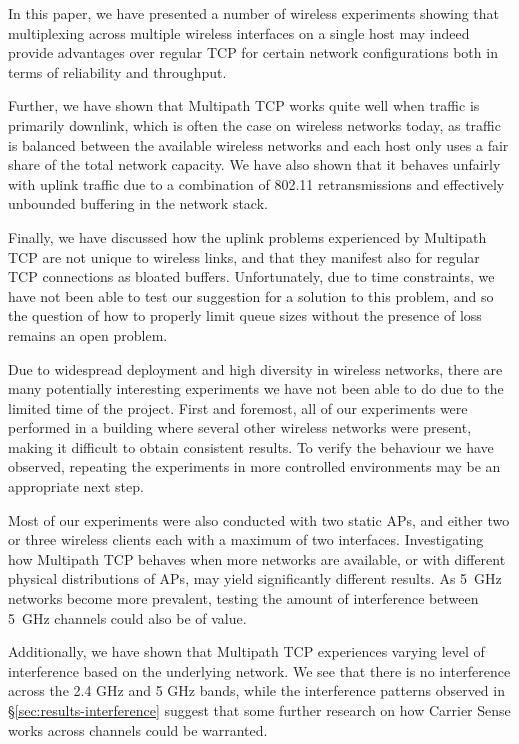 In this paper, we have presented a number of wireless experiments showing that
multiplexing across multiple wireless interfaces on a single host may indeed
provide advantages over regular TCP for certain network
configurations both in terms of reliability and throughput.

Further, we have shown that Multipath TCP works quite well when traffic is
primarily downlink, which is often the case on wireless networks today, as 
traffic is balanced between the available wireless networks and each host only 
uses a fair share of the total network capacity. We have also shown that 
it behaves unfairly with uplink traffic due to a combination of 
802.11 retransmissions and effectively unbounded buffering in the network stack.

Finally, we have discussed how the uplink problems experienced by Multipath TCP
are not unique to wireless links, and that they manifest also for regular TCP
connections as bloated buffers. Unfortunately, due to time constraints, we have 
not been able to test our suggestion for a solution to this problem, and so the 
question of how to properly limit queue sizes without the presence of loss 
remains an open problem.

Due to widespread deployment and high diversity in wireless networks, there
are many potentially interesting experiments we have not been able to do due to
the limited time of the project. First and foremost, all of our experiments were 
performed in a building where several other wireless networks were present, 
making it difficult to obtain consistent results. To verify the behaviour we 
have observed, repeating the experiments in more controlled environments may be 
an appropriate next step.

Most of our experiments were also conducted with two static APs, and either two 
or three wireless clients each with a maximum of two interfaces. Investigating 
how Multipath TCP behaves when more networks are available, or with different 
physical distributions of APs, may yield significantly different results. 
As 5~GHz networks become more prevalent, testing the amount of interference 
between 5~GHz channels could also be of value. 

Additionally, we have shown that Multipath TCP experiences varying level of 
interference based on the underlying network. We see that there is no 
interference across the 2.4 GHz and 5 GHz bands, while the interference patterns 
observed in \S\ref{sec:results-interference} suggest that some further research 
on how Carrier Sense works across channels could be warranted.

